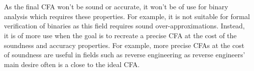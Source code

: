 \documentclass{kththesis}
\begin{document}
\\ \\
As the final CFA won't be sound or accurate, it won't be of use for binary analysis which requires these properties. For example, it is not suitable for formal verification of binaries as this field requires sound over-approximations. Instead, it is of more use when the goal is to recreate a precise CFA at the cost of the soundness and accuracy properties. For example, more precise CFAs at the cost of soundness are useful in fields such as reverse engineering as reverse engineers' main desire often is a close to the ideal CFA.


\end{document}
